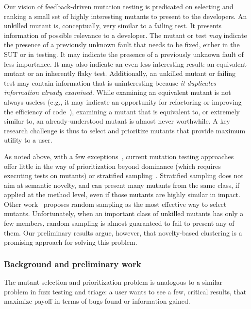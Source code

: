 Our vision of feedback-driven mutation testing is predicated on selecting and ranking a small
set of highly interesting mutants to present to the developers.  An unkilled
mutant is, conceptually, very similar to a failing test.  It presents
information of possible relevance to a developer.  The mutant or test \emph{may}
indicate the presence of a previously unknown fault that needs to be fixed,
either in the SUT or in testing.  It may indicate the presence of a previously
unknown fault of less importance.  It may also indicate an even less interesting
result: an equivalent mutant or an inherently flaky test.  Additionally, an
unkilled mutant or failing test may contain information that is uninteresting
because \emph{it duplicates information already examined.}  While examining an
equivalent mutant is not always useless (e.g., it may indicate an opportunity
for refactoring or improving the efficiency of
code~\cite{ivankovic2018industrial,groce2018verified}), examining a mutant that
is equivalent to, or extremely similar to, an already-understood mutant is
almost never worthwhile.  A key research challenge is thus to select and
prioritize mutants that provide maximum utility to a user.

As noted above, with a few exceptions~\cite{MutGoogle,FaRM,MutQuality}, current mutation testing approaches
offer little in the way of prioritization beyond dominance (which
requires executing tests on mutants) or stratified sampling~\cite{gopinath2017mutation,MutQuality}.
Stratified sampling does not aim at semantic novelty, and can present many
mutants from the same class, if applied at the method level, even if those
mutants are highly similar in impact.  Other work~\cite{gopinath2015howhard}
proposes random sampling as the most effective way to select mutants.
Unfortunately, when an important class of unkilled mutants has only a few
members, random sampling is almost guaranteed to fail to present any of them.
Our preliminary results argue, however, that novelty-based clustering is a
promising approach for solving this problem.

\subsubsection{Background and preliminary work}

The mutant selection and prioritization problem is analogous to a similar
problem in fuzz testing and triage: a user wants to see a few,
critical results, that maximize payoff in
terms of bugs found or information gained.

